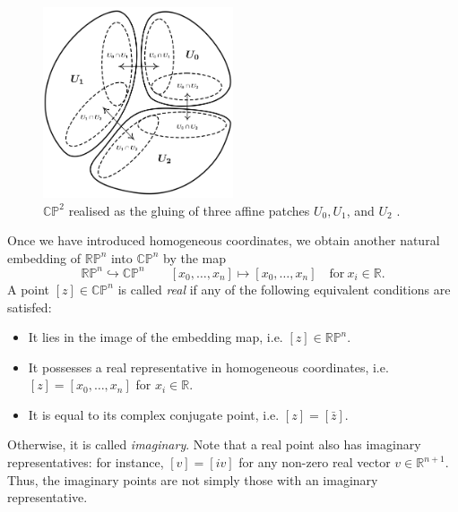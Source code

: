 \documentclass[12pt,a4paper]{article}
\theoremstyle{BoldTopSpacing}
\theoremstyle{BoldTopSpacing}
\theoremstyle{BoldTopSpacing}
\theoremstyle{BoldTopBottomSpacing}
\theoremstyle{BoldTopSpacing}
\theoremstyle{BoldTopBottomSpacing}
\theoremstyle{remark}
\begin{document}
\begin{figure}[H]
    \centering
    \includegraphics[width=0.5\textwidth]{affine-patches.png}
    \caption[$\mathbb{C}\mathbb{P}^2$ realised as the gluing of three affine patches $U_0, U_1$, and $U_2$.]{$\mathbb{C}\mathbb{P}^2$ realised as the gluing of three affine patches $U_0, U_1$, and $U_2$ \cite{toricfanovarieties2005}.}
    \label{fig:affine-patches-diagram}
\end{figure}

Once we have introduced homogeneous coordinates, we obtain another natural embedding of $\mathbb{R}\mathbb{P}^n$ into $\mathbb{C}\mathbb{P}^n$ by the map
\[
    \mathbb{R}\mathbb{P}^n \hookrightarrow \mathbb{C}\mathbb{P}^n \quad \quad [x_{0}, \dots, x_{n}] \mapsto [x_{0}, \dots, x_{n}] \quad \text{for} \ x_{i} \in \mathbb{R}.
\]
A point $[z] \in \mathbb{C}\mathbb{P}^n$ is called \textit{real} if any of the following equivalent conditions are satisfed:
\begin{itemize}
    \item It lies in the image of the embedding map, i.e. $[z] \in \mathbb{R}\mathbb{P}^n$.
    \item It possesses a real representative in homogeneous coordinates, i.e. $[z] = [x_{0}, \dots, x_{n}]$ for $x_{i} \in \mathbb{R}$.
    \item It is equal to its complex conjugate point, i.e. $[z] = [\bar{z}]$.
\end{itemize}
Otherwise, it is called \textit{imaginary}. Note that a real point also has imaginary representatives: for instance, $[v] = [i v]$ for any non-zero real vector $v \in \mathbb{R}^{n+1}$. Thus, the imaginary points are not simply those with an imaginary representative.
\end{document}
